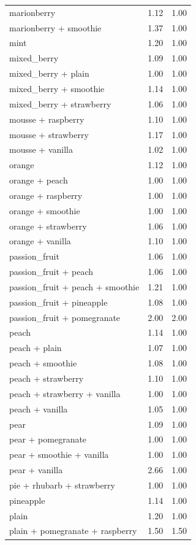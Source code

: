 \begin{table}
\begin{tabular}{lrr}
marionberry & 1.12 & 1.00 \\
marionberry + smoothie & 1.37 & 1.00 \\
mint & 1.20 & 1.00 \\
mixed\_berry & 1.09 & 1.00 \\
mixed\_berry + plain & 1.00 & 1.00 \\
mixed\_berry + smoothie & 1.14 & 1.00 \\
mixed\_berry + strawberry & 1.06 & 1.00 \\
mousse + raspberry & 1.10 & 1.00 \\
mousse + strawberry & 1.17 & 1.00 \\
mousse + vanilla & 1.02 & 1.00 \\
orange & 1.12 & 1.00 \\
orange + peach & 1.00 & 1.00 \\
orange + raspberry & 1.00 & 1.00 \\
orange + smoothie & 1.00 & 1.00 \\
orange + strawberry & 1.06 & 1.00 \\
orange + vanilla & 1.10 & 1.00 \\
passion\_fruit & 1.06 & 1.00 \\
passion\_fruit + peach & 1.06 & 1.00 \\
passion\_fruit + peach + smoothie & 1.21 & 1.00 \\
passion\_fruit + pineapple & 1.08 & 1.00 \\
passion\_fruit + pomegranate & 2.00 & 2.00 \\
peach & 1.14 & 1.00 \\
peach + plain & 1.07 & 1.00 \\
peach + smoothie & 1.08 & 1.00 \\
peach + strawberry & 1.10 & 1.00 \\
peach + strawberry + vanilla & 1.00 & 1.00 \\
peach + vanilla & 1.05 & 1.00 \\
pear & 1.09 & 1.00 \\
pear + pomegranate & 1.00 & 1.00 \\
pear + smoothie + vanilla & 1.00 & 1.00 \\
pear + vanilla & 2.66 & 1.00 \\
pie + rhubarb + strawberry & 1.00 & 1.00 \\
pineapple & 1.14 & 1.00 \\
plain & 1.20 & 1.00 \\
plain + pomegranate + raspberry & 1.50 & 1.50 \\

\end{tabular}
\end{table}
